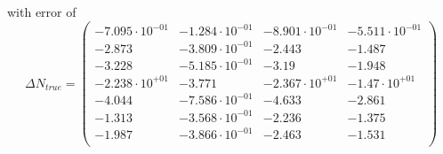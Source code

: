 \documentclass[]{article}
\begin{document}
with error of 
\begin{equation}
\Delta N_{true} = \begin{pmatrix}
   -7.095\cdot 10^{-01} & -1.284\cdot 10^{-01} & -8.901\cdot 10^{-01} & -5.511\cdot 10^{-01} \\
   -2.873 & -3.809\cdot 10^{-01} & -2.443 & -1.487 \\
   -3.228 & -5.185\cdot 10^{-01} & -3.19 & -1.948 \\
   -2.238\cdot 10^{+01} & -3.771 & -2.367\cdot 10^{+01} & -1.47\cdot 10^{+01} \\
   -4.044 & -7.586\cdot 10^{-01} & -4.633 & -2.861 \\
   -1.313 & -3.568\cdot 10^{-01} & -2.236 & -1.375 \\
   -1.987 & -3.866\cdot 10^{-01} & -2.463 & -1.531 \\
\end{pmatrix}
\end{equation}
\end{document}
